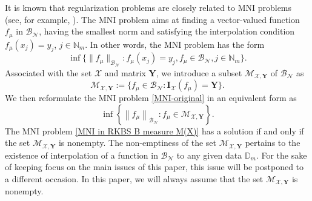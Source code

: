 \documentclass[11pt]{article}
\begin{document}
It is known that regularization problems are closely related to MNI problems (see, for example, \cite{wang2021representer}). The MNI problem aims at finding a vector-valued function $f_{\mu}$ in $\mathcal{B}_{\mathcal{N}}$, having the smallest norm and
satisfying the interpolation condition $f_{\mu}(x_j)=y_j$, $j\in\mathbb{N}_m$. In other words, the MNI problem has the form  
\begin{equation}\label{MNI-original}
\inf
\{\|f_{\mu}\|_{\mathcal{B}_{\mathcal{N}}}: f_{\mu}(x_j)=y_j, f_{\mu}\in\mathcal{B}_{\mathcal{N}}, j\in\mathbb{N}_m\}.
\end{equation}
Associated with the set $\mathcal{X}$ and matrix $\mathbf{Y}$, we introduce a subset $\mathcal{M}_{\mathcal{X},\mathbf{Y}}$ of $\mathcal{B}_{\mathcal{N}}$ as
\begin{equation}\label{hyperplane YES DC}
    \mathcal{M}_{\mathcal{X},\mathbf{Y}}:=\{f_\mu \in {\mathcal{B}_{\mathcal{N}}}: \mathbf{I}_{\mathcal{X}}(f_\mu)=\mathbf{Y}\}.
\end{equation}
We then reformulate the MNI problem \eqref{MNI-original} in an equivalent form as 
\begin{equation}\label{MNI in RKBS B measure M(X)}
    \inf \left\{\left\|f_\mu\right\|_{{\mathcal{B}_{\mathcal{N}}}}: f_\mu \in  \mathcal{M}_{\mathcal{X},\mathbf{Y}}\right\}.
\end{equation}
The MNI problem \eqref{MNI in RKBS B measure M(X)} has a solution if and only if the set $\mathcal{M}_{\mathcal{X},\mathbf{Y}}$ is nonempty. 
The non-emptiness of the set $\mathcal{M}_{\mathcal{X},\mathbf{Y}}$ pertains to the existence of interpolation of a function in $\mathcal{B}_{\mathcal{N}}$ to any given data $\mathbb{D}_m$. For the sake of keeping focus on the main issues of this paper, this issue will be postponed to a different occasion. In this paper, we will always assume that the set $\mathcal{M}_{\mathcal{X},\mathbf{Y}}$ is nonempty.
\end{document}
